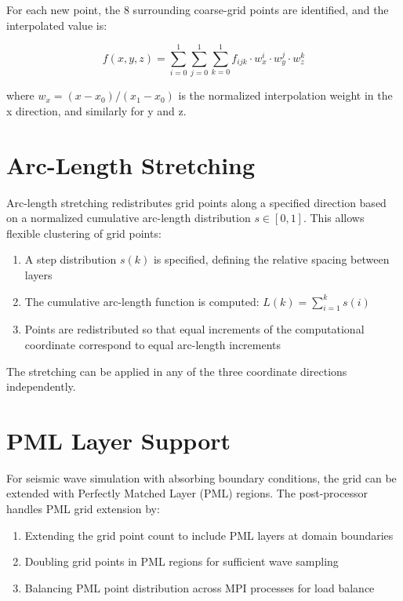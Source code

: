 \documentclass[11pt,a4paper]{report}
\begin{document}
For each new point, the 8 surrounding coarse-grid points are identified, and the interpolated value is:

\begin{equation}
    f(x,y,z) = \sum_{i=0}^{1} \sum_{j=0}^{1} \sum_{k=0}^{1} f_{ijk} \cdot w_x^i \cdot w_y^j \cdot w_z^k
\end{equation}

where $w_x = (x - x_0)/(x_1 - x_0)$ is the normalized interpolation weight in the x direction, and similarly for y and z.

\section{Arc-Length Stretching}

Arc-length stretching redistributes grid points along a specified direction based on a normalized cumulative arc-length distribution $s \in [0,1]$. This allows flexible clustering of grid points:

\begin{enumerate}
    \item A step distribution $s(k)$ is specified, defining the relative spacing between layers
    \item The cumulative arc-length function is computed: $L(k) = \sum_{i=1}^{k} s(i)$
    \item Points are redistributed so that equal increments of the computational coordinate correspond to equal arc-length increments
\end{enumerate}

The stretching can be applied in any of the three coordinate directions independently.

\section{PML Layer Support}

For seismic wave simulation with absorbing boundary conditions, the grid can be extended with Perfectly Matched Layer (PML) regions. The post-processor handles PML grid extension by:

\begin{enumerate}
    \item Extending the grid point count to include PML layers at domain boundaries
    \item Doubling grid points in PML regions for sufficient wave sampling
    \item Balancing PML point distribution across MPI processes for load balance
\end{enumerate}
\end{document}
